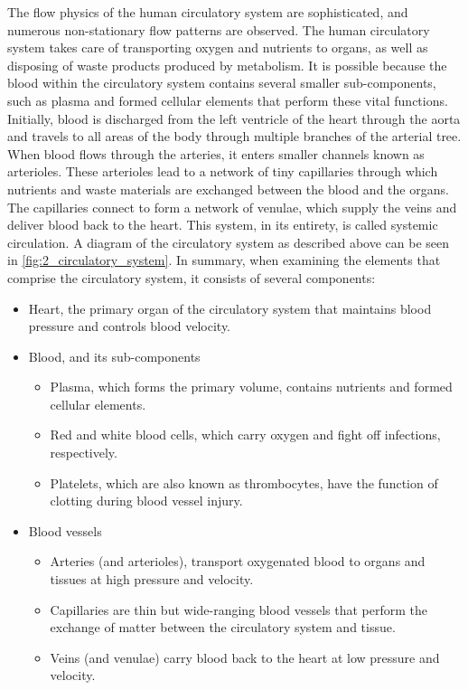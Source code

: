 The flow physics of the human circulatory system are sophisticated, and numerous non-stationary flow patterns are observed. The human circulatory system takes care of transporting oxygen and nutrients to organs, as well as disposing of waste products produced by metabolism. It is possible because the blood within the circulatory system contains several smaller sub-components, such as plasma and formed cellular elements that perform these vital functions. Initially, blood is discharged from the left ventricle of the heart through the aorta and travels to all areas of the body through multiple branches of the arterial tree. When blood flows through the arteries, it enters smaller channels known as arterioles. These arterioles lead to a network of tiny capillaries through which nutrients and waste materials are exchanged between the blood and the organs. The capillaries connect to form a network of venulae, which supply the veins and deliver blood back to the heart. This system, in its entirety, is called systemic circulation. A diagram of the circulatory system as described above can be seen in \cref{fig:2_circulatory_system}. In summary, when examining the elements that comprise the circulatory system, it consists of several components:
\begin{itemize}
	\item Heart, the primary organ of the circulatory system that maintains blood pressure and controls blood velocity.
	\item Blood, and its sub-components
	\begin{itemize}
		\item Plasma, which forms the primary volume, contains nutrients and formed cellular elements.
		\item Red and white blood cells, which carry oxygen and fight off infections, respectively.
		\item Platelets, which are also known as thrombocytes, have the function of clotting during blood vessel injury.
	\end{itemize}
	\item Blood vessels
	\begin{itemize}
		\item Arteries (and arterioles), transport oxygenated blood to organs and tissues at high pressure and velocity.
		\item Capillaries are thin but wide-ranging blood vessels that perform the exchange of matter between the circulatory system and tissue.
		\item Veins (and venulae) carry blood back to the heart at low pressure and velocity.
	\end{itemize}
\end{itemize}


